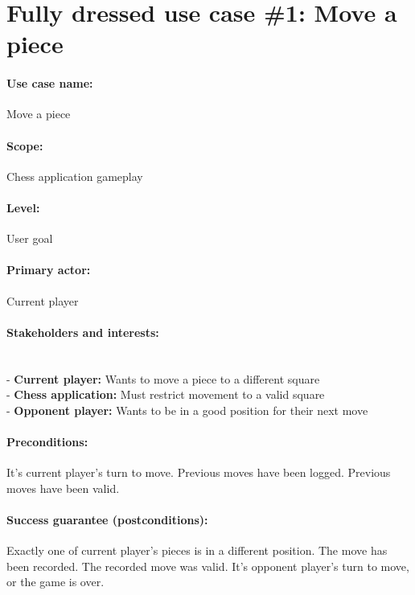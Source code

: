 \documentclass{article}
\begin{document}
\normalsize
\newpage
\section{Fully dressed use case \#1: Move a piece}

\paragraph{Use case name:} Move a piece

\paragraph{Scope:} Chess application gameplay

\paragraph{Level:} User goal

\paragraph{Primary actor:} Current player

\paragraph{Stakeholders and interests:}\mbox{}\\
- \textbf{Current player:} Wants to move a piece to a different square\\
- \textbf{Chess application:} Must restrict movement to a valid square\\
- \textbf{Opponent player:} Wants to be in a good position for their next move

\paragraph{Preconditions:} It's current player's turn to move. Previous moves have been logged. Previous moves have been valid.

\paragraph{Success guarantee (postconditions):} Exactly one of current player's pieces is in a different position. The move has been recorded. The recorded move was valid. It's opponent player's turn to move, or the game is over.
\end{document}
